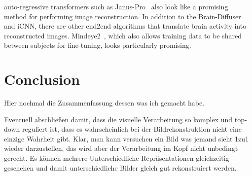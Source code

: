 auto-regressive transformers such as Janus-Pro~\cite{chenJanusproUnifiedMultimodal2025} also look like a promising method for performing image reconstruction. In addition to the Brain-Diffuser and iCNN, there are other end2end algorithms that translate brain activity into reconstructed images. Mindeye2~\cite{scottiMindEye2SharedSubjectModels2024}, which also allows training data to be shared between subjects for fine-tuning, looks particularly promising.


\section{Conclusion}
Hier nochmal die Zusammenfassung dessen was ich gemacht habe. 


Eventuell abschließen damit, dass die visuelle Verarbeitung so komplex und top-down reguliert ist, dass es wahrscheinlich bei der Bildrekonstruktion nicht eine einzige Wahrheit gibt. Klar, man kann versuchen ein Bild was jemand sieht 1zu1 wieder darzustellen, das wird aber der Verarbeitung im Kopf nicht unbedingt gerecht. Es können mehrere Unterschiedliche Repräsentationen gleichzeitig geschehen und damit unterschiedliche Bilder gleich gut rekonstruiert werden. 
